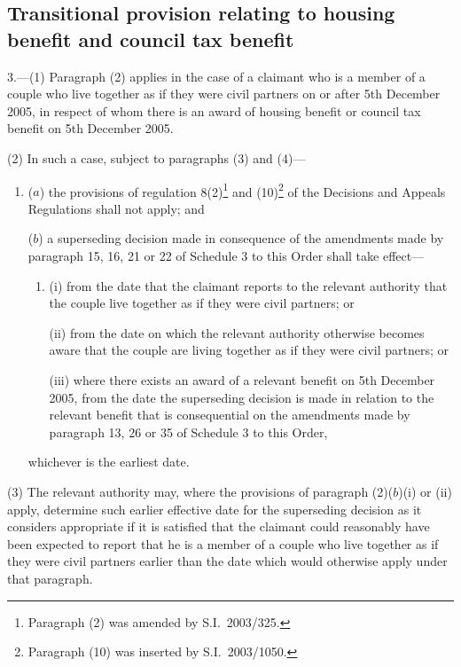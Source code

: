 \documentclass[12pt,a4paper]{article}
\begin{document}
\subsection[3. Transitional provision relating to housing benefit and council tax benefit]{Transitional provision relating to housing benefit and council tax benefit}

3.---(1)  Paragraph (2) applies in the case of a claimant who is a member of a couple who live together as if they were civil partners on or after 5th December 2005, in respect of whom there is an award of housing benefit or council tax benefit on 5th December 2005.

(2) In such a case, subject to paragraphs (3) and (4)—
\begin{enumerate}\item[]
($a$) the provisions of regulation 8(2)\footnote{Paragraph (2) was amended by S.I.\ 2003/325.} and (10)\footnote{Paragraph (10) was inserted by S.I.\ 2003/1050.} of the Decisions and Appeals Regulations shall not apply; and

($b$) a superseding decision made in consequence of the amendments made by paragraph 15, 16, 21 or 22 of Schedule 3 to this Order shall take effect—
\begin{enumerate}\item[]
(i) from the date that the claimant reports to the relevant authority that the couple live together as if they were civil partners; or

(ii) from the date on which the relevant authority otherwise becomes aware that the couple are living together as if they were civil partners; or

(iii) where there exists an award of a relevant benefit on 5th December 2005, from the date the superseding decision is made in relation to the relevant benefit that is consequential on the amendments made by paragraph 13, 26 or 35 of Schedule 3 to this Order,
\end{enumerate}
whichever is the earliest date.
\end{enumerate}

(3) The relevant authority may, where the provisions of paragraph (2)($b$)(i)  or (ii)  apply, determine such earlier effective date for the superseding decision as it considers appropriate if it is satisfied that the claimant could reasonably have been expected to report that he is a member of a couple who live together as if they were civil partners earlier than the date which would otherwise apply under that paragraph.
\end{document}
